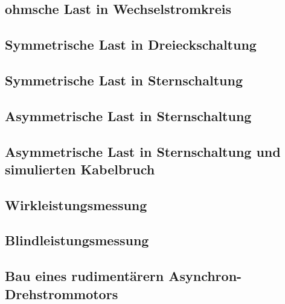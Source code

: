 \documentclass[12pt,english,ngerman]{scrartcl}
\begin{document}
\subsection{ohmsche Last in Wechselstromkreis}


\subsection{Symmetrische Last in Dreieckschaltung}


\subsection{Symmetrische Last in Sternschaltung}


\subsection{Asymmetrische Last in Sternschaltung}


\subsection{Asymmetrische Last in Sternschaltung und simulierten Kabelbruch}


\subsection{Wirkleistungsmessung}


\subsection{Blindleistungsmessung}


\subsection{Bau eines rudimentärern Asynchron-Drehstrommotors}

\newpage

\printbibliography
\listoffigures
\listoftables
\end{document}

